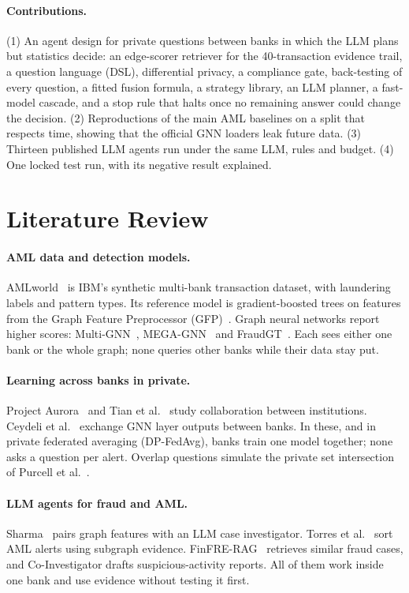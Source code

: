 \documentclass[11pt,a4paper]{article}
\begin{document}
\paragraph{Contributions.} (1) An agent design for private questions between banks in which the LLM plans but statistics decide: an edge-scorer retriever for the 40-transaction evidence trail, a question language (DSL), differential privacy, a compliance gate, back-testing of every question, a fitted fusion formula, a strategy library, an LLM planner, a fast-model cascade, and a stop rule that halts once no remaining answer could change the decision. (2) Reproductions of the main AML baselines on a split that respects time, showing that the official GNN loaders leak future data. (3) Thirteen published LLM agents run under the same LLM, rules and budget. (4) One locked test run, with its negative result explained.

\section{Literature Review}

\paragraph{AML data and detection models.} AMLworld~\cite{altman2023} is IBM's synthetic multi-bank transaction dataset, with laundering labels and pattern types. Its reference model is gradient-boosted trees on features from the Graph Feature Preprocessor (GFP)~\cite{blanusa2024}. Graph neural networks report higher scores: Multi-GNN~\cite{egressy2024}, MEGA-GNN~\cite{bilgi2025} and FraudGT~\cite{lin2024}. Each sees either one bank or the whole graph; none queries other banks while their data stay put.

\paragraph{Learning across banks in private.} Project Aurora~\cite{aurora} and Tian et al.~\cite{tian2025} study collaboration between institutions. Ceydeli et al.~\cite{ceydeli2026} exchange GNN layer outputs between banks. In these, and in private federated averaging (DP-FedAvg), banks train one model together; none asks a question per alert. Overlap questions simulate the private set intersection of Purcell et al.~\cite{purcell2023}.

\paragraph{LLM agents for fraud and AML.} Sharma~\cite{sharma2026} pairs graph features with an LLM case investigator. Torres et al.~\cite{torres2026} sort AML alerts using subgraph evidence. FinFRE-RAG~\cite{tan2026} retrieves similar fraud cases, and Co-Investigator drafts suspicious-activity reports. All of them work inside one bank and use evidence without testing it first.
\end{document}
